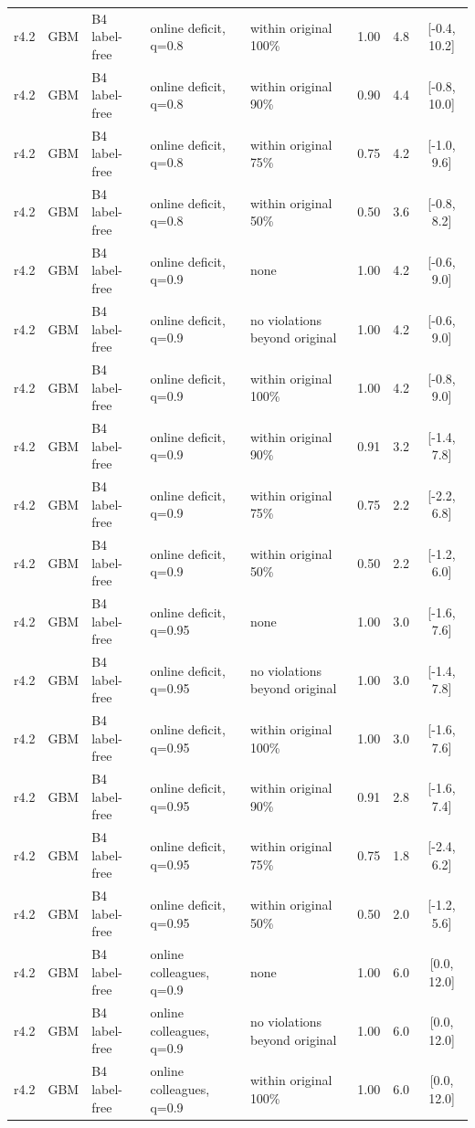 \begin{longtable}{lllp{4.2cm}p{3.4cm}ccc}
r4.2 & GBM & B4 label-free & online deficit, q=0.8 & within original 100\% & 1.00 & 4.8 & [-0.4, 10.2] \\
r4.2 & GBM & B4 label-free & online deficit, q=0.8 & within original 90\% & 0.90 & 4.4 & [-0.8, 10.0] \\
r4.2 & GBM & B4 label-free & online deficit, q=0.8 & within original 75\% & 0.75 & 4.2 & [-1.0, 9.6] \\
r4.2 & GBM & B4 label-free & online deficit, q=0.8 & within original 50\% & 0.50 & 3.6 & [-0.8, 8.2] \\
r4.2 & GBM & B4 label-free & online deficit, q=0.9 & none & 1.00 & 4.2 & [-0.6, 9.0] \\
r4.2 & GBM & B4 label-free & online deficit, q=0.9 & no violations beyond original & 1.00 & 4.2 & [-0.6, 9.0] \\
r4.2 & GBM & B4 label-free & online deficit, q=0.9 & within original 100\% & 1.00 & 4.2 & [-0.8, 9.0] \\
r4.2 & GBM & B4 label-free & online deficit, q=0.9 & within original 90\% & 0.91 & 3.2 & [-1.4, 7.8] \\
r4.2 & GBM & B4 label-free & online deficit, q=0.9 & within original 75\% & 0.75 & 2.2 & [-2.2, 6.8] \\
r4.2 & GBM & B4 label-free & online deficit, q=0.9 & within original 50\% & 0.50 & 2.2 & [-1.2, 6.0] \\
r4.2 & GBM & B4 label-free & online deficit, q=0.95 & none & 1.00 & 3.0 & [-1.6, 7.6] \\
r4.2 & GBM & B4 label-free & online deficit, q=0.95 & no violations beyond original & 1.00 & 3.0 & [-1.4, 7.8] \\
r4.2 & GBM & B4 label-free & online deficit, q=0.95 & within original 100\% & 1.00 & 3.0 & [-1.6, 7.6] \\
r4.2 & GBM & B4 label-free & online deficit, q=0.95 & within original 90\% & 0.91 & 2.8 & [-1.6, 7.4] \\
r4.2 & GBM & B4 label-free & online deficit, q=0.95 & within original 75\% & 0.75 & 1.8 & [-2.4, 6.2] \\
r4.2 & GBM & B4 label-free & online deficit, q=0.95 & within original 50\% & 0.50 & 2.0 & [-1.2, 5.6] \\
r4.2 & GBM & B4 label-free & online colleagues, q=0.9 & none & 1.00 & 6.0 & [0.0, 12.0] \\
r4.2 & GBM & B4 label-free & online colleagues, q=0.9 & no violations beyond original & 1.00 & 6.0 & [0.0, 12.0] \\
r4.2 & GBM & B4 label-free & online colleagues, q=0.9 & within original 100\% & 1.00 & 6.0 & [0.0, 12.0] \\

\end{longtable}
